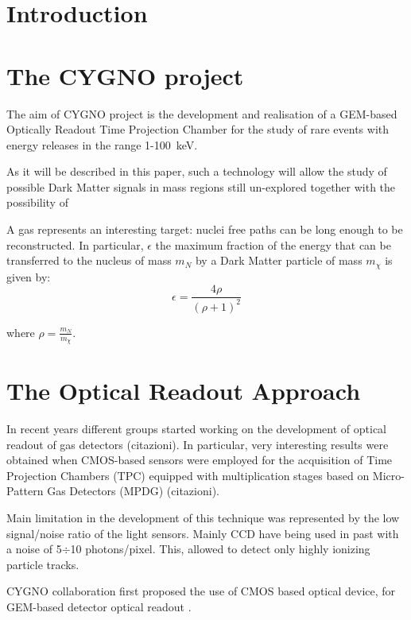 \documentclass[physics,article,submit,moreauthors,pdftex]{Definitions/mdpi}
\begin{document}
\section{Introduction}
\section{The CYGNO project}

The aim of CYGNO project is the development and realisation of a GEM-based Optically Readout Time Projection Chamber for the study of rare events with energy releases in the range 1-100~keV. 

As it will be described in this paper, such a technology will allow the study of possible Dark Matter signals in mass regions still un-explored together with the possibility of 

A gas represents an interesting target: nuclei free paths can be long enough to be reconstructed. 
In particular, $\epsilon$ the maximum fraction of the energy that can be
transferred to the nucleus of mass $m_N$ by a Dark Matter particle of mass
$m_{\chi}$ is given by:
\begin{equation}
\epsilon = \frac {4 \rho}{\left( \rho + 1 \right)^2}
\label{eq:trans}
\end{equation}

where $\rho = \frac{m_N}{m_{\chi}}$.


\section{The Optical Readout Approach}
\label{sect:opro}

In recent years different groups started working on the development of optical readout of gas detectors (citazioni). In particular, very interesting results were obtained when CMOS-based sensors were employed for the acquisition of Time Projection Chambers (TPC) equipped with multiplication stages based on Micro-Pattern Gas Detectors (MPDG) (citazioni).

Main limitation in the development of this technique was represented
by the low signal/noise ratio of the light sensors. Mainly CCD have being
used in past with a noise of 5$\div$10 photons/pixel. This, allowed to
detect only highly ionizing particle tracks.

CYGNO collaboration first proposed the use of CMOS based optical device, 
for GEM-based detector optical readout \cite{bib:orange1, bib:orange2, bib:orange3, bib:orange4, bib:elba}.
\end{document}
